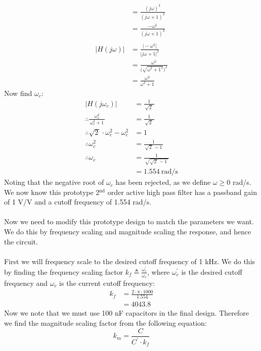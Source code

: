 \begin{enumerate}
{\begin{align*}
			&= \frac{(j\omega)^2}{(j\omega+1)^2} \\
			&= \frac{-\omega^2}{(j\omega+1)^2} \\
			\\
			\big|H(j\omega)\big| &= \frac{\big|-\omega^2\big|}{\big|j\omega+1\big|^2} \\
			&= \frac{\omega^2}{\Big(\sqrt{\omega^2+1^2}\Big)^2} \\
			&= \frac{\omega^2}{\omega^2+1}
		\end{align*}
		Now find $\omega_c$:
		\begin{align*}
			\big|H(j\omega_c)\big| &= \frac{1}{\, \sqrt{2 \,} \,} \\
			\therefore \frac{\omega_c^2}{\, \omega_c^2+1 \,} &= \frac{1}{\, \sqrt{2 \,} \,} \\
			\therefore \sqrt{2 \,} \cdot \omega_c^2 - \omega_c^2 &= 1 \\
			\therefore \omega_c^2 &= \frac{1}{\, \sqrt{2 \,} - 1 \,} \\
			\therefore \omega_c &= \frac{1}{\, \sqrt{\sqrt{2 \,} - 1 \,} \,} \\
			&= 1.554 \ \text{rad/s}
		\end{align*}
		Noting that the negative root of $\omega_c$ has been rejected, as we define $\omega \geq 0$ rad/s. \\
		We now know this prototype 2$^{\text{nd}}$ order active high pass filter has a passband gain of 1 V/V and a cutoff frequency of 1.554 rad/s. \\ 
		\\
		Now we need to modify this prototype design to match the parameters we want. We do this by frequency scaling and magnitude scaling the response, and hence the circuit. \\
		\\
		First we will frequency scale to the desired cutoff frequency of 1 kHz. We do this by finding the frequency scaling factor $k_f \triangleq \frac{\omega_c^{'}}{\omega_c}$, where $\omega_c^{'}$ is the desired cutoff frequency and $\omega_c$ is the current cutoff frequency:
		\begin{align*}
			k_f &= \frac{2 \cdot \pi \cdot 1000}{1.554} \\
			&= 4043.8
		\end{align*}
		Now we note that we must use 100 nF capacitors in the final design. Therefore we find the magnitude scaling factor from the following equation:
		\begin{equation*}
			k_m = \frac{C}{C^{'} \cdot k_f}
		\end{equation*}
}
\end{enumerate}
